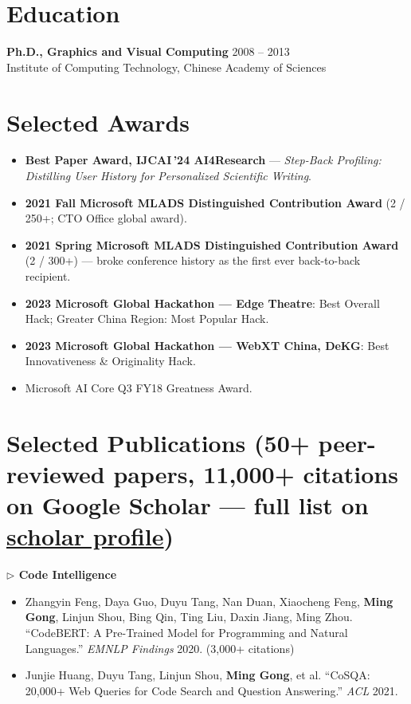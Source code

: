 \documentclass[10.5pt,letterpaper]{article}
\begin{document}
\section*{Education}
\noindent\textbf{Ph.D., Graphics and Visual Computing} \hfill 2008 -- 2013\\
Institute of Computing Technology, Chinese Academy of Sciences

\section*{Selected Awards}
\begin{itemize}
  \item \textbf{Best Paper Award, IJCAI\,'24 AI4Research} --- \textit{Step-Back Profiling: Distilling User History for Personalized Scientific Writing}.
  \item \textbf{2021 Fall Microsoft MLADS Distinguished Contribution Award} (2 / 250+; CTO Office global award).
  \item \textbf{2021 Spring Microsoft MLADS Distinguished Contribution Award} (2 / 300+) --- broke conference history as the first ever back-to-back recipient.
  \item \textbf{2023 Microsoft Global Hackathon --- Edge Theatre}: Best Overall Hack; Greater China Region: Most Popular Hack.
  \item \textbf{2023 Microsoft Global Hackathon --- WebXT China, DeKG}: Best Innovativeness \& Originality Hack.
  \item Microsoft AI Core Q3 FY18 Greatness Award.
\end{itemize}

\section*{Selected Publications (50+ peer-reviewed papers, 11{,}000+ citations on Google Scholar --- full list on \href{https://scholar.google.com/citations?user=c7JEFwsAAAAJ}{scholar profile})}

\noindent\textcolor{blue!60!black}{\textbf{$\triangleright$ Code Intelligence}}
\begin{itemize}
  \item Zhangyin Feng, Daya Guo, Duyu Tang, Nan Duan, Xiaocheng Feng, \textbf{Ming Gong}, Linjun Shou, Bing Qin, Ting Liu, Daxin Jiang, Ming Zhou. ``CodeBERT: A Pre-Trained Model for Programming and Natural Languages.'' \textit{EMNLP Findings} 2020. (3,000+ citations)
  \item Junjie Huang, Duyu Tang, Linjun Shou, \textbf{Ming Gong}, et al. ``CoSQA: 20,000+ Web Queries for Code Search and Question Answering.'' \textit{ACL} 2021.
\end{itemize}
\end{document}
